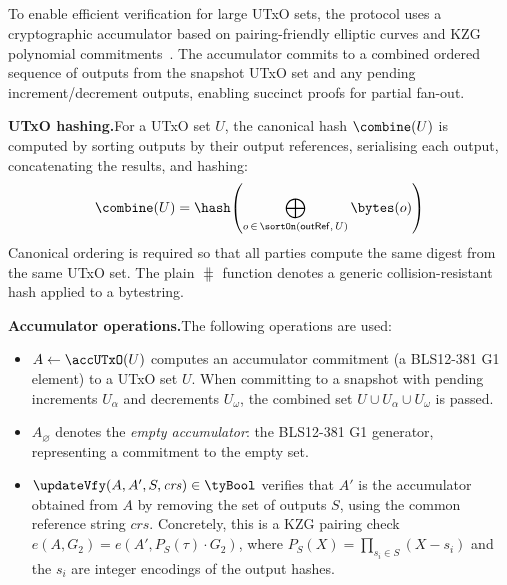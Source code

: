 
\subsection{}\label{sec:bls-accumulator}

{\color{red}
To enable efficient verification for large UTxO sets, the protocol uses a
cryptographic accumulator based on pairing-friendly elliptic curves and
KZG polynomial commitments~\cite{KZG10}. The accumulator commits to a combined
ordered sequence of outputs from the snapshot UTxO set and any pending
increment/decrement outputs, enabling succinct proofs for partial fan-out.

\noindent\textbf{UTxO hashing.}\quad For a UTxO set $U$, the canonical hash $\combine(U)$ is computed by
sorting outputs by their output references, serialising each output, concatenating the results,
and hashing:
\[
  \combine(U) = \hash\!\left(\bigoplus_{o \,\in\, \sortOn(\mathsf{outRef},\, U)} \bytes(o)\right)
\]
Canonical ordering is required so that all parties compute the same digest from the same UTxO set.
The plain $\hash$ function denotes a generic collision-resistant hash applied to a bytestring.

\noindent\textbf{Accumulator operations.}\quad The following operations are used:
\begin{itemize}
  \item $A \gets \accUTxO(U)$ computes an accumulator commitment (a BLS12-381 G1 element) to
        a UTxO set $U$. When committing to a snapshot with pending increments $U_\alpha$ and
        decrements $U_\omega$, the combined set $U \cup U_\alpha \cup U_\omega$ is passed.
  \item $A_\varnothing$ denotes the \emph{empty accumulator}: the BLS12-381 G1 generator,
        representing a commitment to the empty set.
  \item $\updateVfy(A, A', S, \mathit{crs}) \in \tyBool$ verifies that $A'$ is the
        accumulator obtained from $A$ by removing the set of outputs $S$, using the
        common reference string $\mathit{crs}$. Concretely, this is a KZG pairing check
        $e(A, G_2) = e(A', P_S(\tau) \cdot G_2)$, where $P_S(X) = \prod_{s_i \in S}(X - s_i)$
        and the $s_i$ are integer encodings of the output hashes.
\end{itemize}

}
